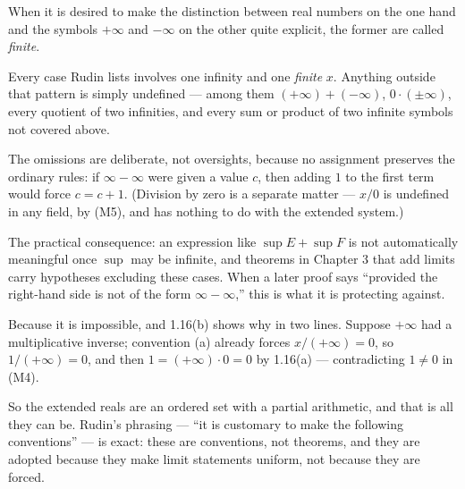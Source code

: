 When it is desired to make the distinction between real numbers on the one hand
and the symbols $+\infty$ and $-\infty$ on the other quite explicit, the former
are called \emph{finite}.

\begin{pitfall}
Every case Rudin lists involves one infinity and one \emph{finite} $x$. Anything
outside that pattern is simply undefined --- among them $(+\infty)+(-\infty)$,
$0\cdot(\pm\infty)$, every quotient of two infinities, and every sum or product
of two infinite symbols not covered above.

The omissions are deliberate, not oversights, because no assignment preserves
the ordinary rules: if $\infty - \infty$ were given a value $c$, then adding $1$
to the first term would force $c = c+1$. (Division by zero is a separate matter
--- $x/0$ is undefined in any field, by (M5), and has nothing to do with the
extended system.)

The practical consequence: an expression like $\sup E + \sup F$ is not
automatically meaningful once $\sup$ may be infinite, and theorems in Chapter 3
that add limits carry hypotheses excluding these cases. When a later proof says
``provided the right-hand side is not of the form $\infty - \infty$,'' this is
what it is protecting against.
\end{pitfall}

\begin{deeper}
Because it is impossible, and 1.16(b) shows why in two lines. Suppose
$+\infty$ had a multiplicative inverse; convention (a) already forces
$x/(+\infty) = 0$, so $1/(+\infty) = 0$, and then
$1 = (+\infty) \cdot 0 = 0$ by 1.16(a) --- contradicting $1 \ne 0$ in (M4).

So the extended reals are an ordered set with a partial arithmetic, and that is
all they can be. Rudin's phrasing --- ``it is customary to make the following
conventions'' --- is exact: these are conventions, not theorems, and they are
adopted because they make limit statements uniform, not because they are forced.
\end{deeper}
